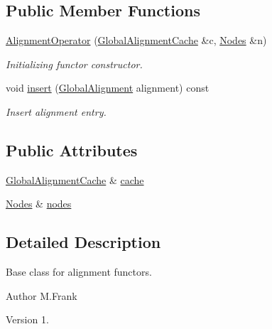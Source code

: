 \subsection*{Public Member Functions}
\begin{DoxyCompactItemize}
\item 
\hyperlink{class_d_d4hep_1_1_alignments_1_1_alignment_operator_a46730d86c085b06213e2d18714df0c02}{Alignment\+Operator} (\hyperlink{class_d_d4hep_1_1_alignments_1_1_global_alignment_cache}{Global\+Alignment\+Cache} \&c, \hyperlink{class_d_d4hep_1_1_alignments_1_1_alignment_operator_a2f25eae1d38abc30a09f7a840ab0662a}{Nodes} \&n)
\begin{DoxyCompactList}\small\item\em Initializing functor constructor. \end{DoxyCompactList}\item 
void \hyperlink{class_d_d4hep_1_1_alignments_1_1_alignment_operator_a86d7e0c21834bbaac6cd92861022f944}{insert} (\hyperlink{class_d_d4hep_1_1_alignments_1_1_global_alignment}{Global\+Alignment} alignment) const
\begin{DoxyCompactList}\small\item\em Insert alignment entry. \end{DoxyCompactList}\end{DoxyCompactItemize}
\subsection*{Public Attributes}
\begin{DoxyCompactItemize}
\item 
\hyperlink{class_d_d4hep_1_1_alignments_1_1_global_alignment_cache}{Global\+Alignment\+Cache} \& \hyperlink{class_d_d4hep_1_1_alignments_1_1_alignment_operator_a931deb1a003ec4c619fae0b0d728f8d2}{cache}
\item 
\hyperlink{class_d_d4hep_1_1_alignments_1_1_alignment_operator_a2f25eae1d38abc30a09f7a840ab0662a}{Nodes} \& \hyperlink{class_d_d4hep_1_1_alignments_1_1_alignment_operator_a3af1a13de9f4772b04471070b6b99676}{nodes}
\end{DoxyCompactItemize}


\subsection{Detailed Description}
Base class for alignment functors. 

\begin{DoxyAuthor}{Author}
M.\+Frank 
\end{DoxyAuthor}
\begin{DoxyVersion}{Version}
1. 
\end{DoxyVersion}


